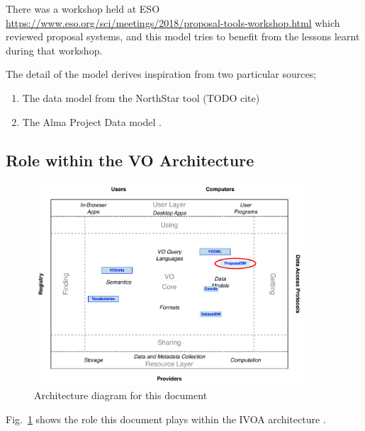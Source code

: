 \documentclass[10pt,a4paper]{ivoa}
\begin{document}
There was a workshop held at ESO \url{https://www.eso.org/sci/meetings/2018/proposal-tools-workshop.html} which reviewed
proposal systems, and this model tries to benefit from the lessons learnt during that workshop.

The detail of the model derives inspiration from two particular sources;
\begin{enumerate}
    \item The data model from the NorthStar tool (TODO cite)
    \item The Alma Project Data model \cite{alma:projdm}.
\end{enumerate}


\subsection{Role within the VO Architecture}

\begin{figure}
\centering


\includegraphics[width=0.9\textwidth]{role_diagram.pdf}
\caption{Architecture diagram for this document}
\label{fig:archdiag}
\end{figure}

Fig.~\ref{fig:archdiag} shows the role this document plays within the
IVOA architecture \citep{2010ivoa.rept.1123A}.
\end{document}
